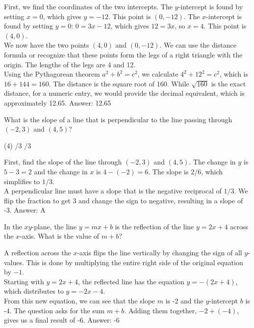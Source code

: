 \documentclass[11pt,paper=a4,answers]{exam}
\begin{document}
\begin{questions}
\begin{solution}
First, we find the coordinates of the two intercepts. The $y$-intercept is found by setting $x = 0$, which gives $y = -12$. This point is $(0, -12)$. The $x$-intercept is found by setting $y = 0$: $0 = 3x - 12$, which gives $12 = 3x$, so $x = 4$. This point is $(4, 0)$.
\\[10pt]
We now have the two points $(4, 0)$ and $(0, -12)$. We can use the distance formula or recognize that these points form the legs of a right triangle with the origin. The lengths of the legs are 4 and 12.
\\[10pt]
Using the Pythagorean theorem $a^2 + b^2 = c^2$, we calculate $4^2 + 12^2 = c^2$, which is $16 + 144 = 160$. The distance is the square root of 160. While $\sqrt{160}$ is the exact distance, for a numeric entry, we would provide the decimal equivalent, which is approximately 12.65.
\vspace{15pt}
Answer: \colorbox{yellow!100}{12.65}
\end{solution}

\question
What is the slope of a line that is perpendicular to the line passing through $(-2, 3)$ and $(4, 5)$?
\begin{tasks}(4)
    /3
    /3
\end{tasks}

\begin{solution}
First, find the slope of the line through $(-2, 3)$ and $(4, 5)$. The change in $y$ is $5 - 3 = 2$ and the change in $x$ is $4 - (-2) = 6$. The slope is $2 / 6$, which simplifies to $1/3$.
\\[10pt]
A perpendicular line must have a slope that is the negative reciprocal of $1/3$. We flip the fraction to get 3 and change the sign to negative, resulting in a slope of -3.
\vspace{15pt}
Answer: \colorbox{yellow!100}{A}
\end{solution}

\question
In the $xy$-plane, the line $y = mx + b$ is the reflection of the line $y = 2x + 4$ across the $x$-axis. What is the value of $m + b$?

\begin{solution}
A reflection across the $x$-axis flips the line vertically by changing the sign of all $y$-values. This is done by multiplying the entire right side of the original equation by $-1$.
\\[10pt]
Starting with $y = 2x + 4$, the reflected line has the equation $y = -(2x + 4)$, which distributes to $y = -2x - 4$.
\\[10pt]
From this new equation, we can see that the slope $m$ is -2 and the $y$-intercept $b$ is -4. The question asks for the sum $m + b$. Adding them together, $-2 + (-4)$, gives us a final result of -6.
\vspace{15pt}
Answer: \colorbox{yellow!100}{-6}
\end{solution}




\end{questions}
\end{document}
